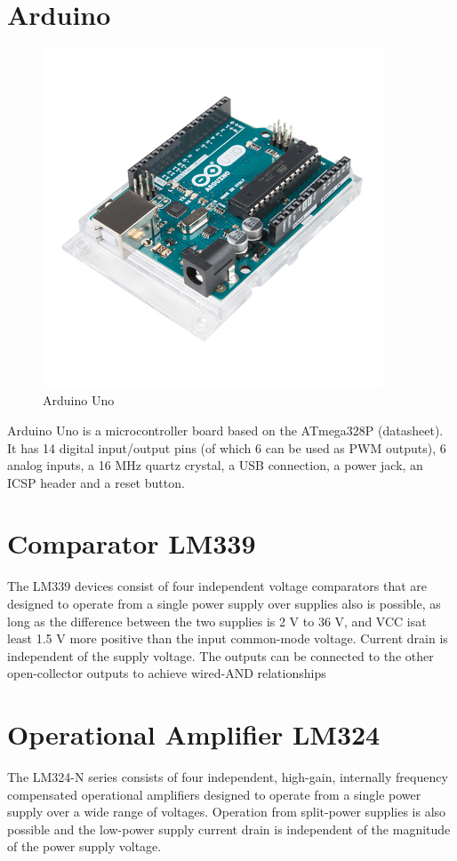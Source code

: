 \section{Arduino}{
\begin{figure}[H]
	\includegraphics[width=0.9\textwidth]{images/arduino.jpg} %
	\caption{Arduino Uno}
	\label{Arduino Uno}
\end{figure}
Arduino Uno is a microcontroller board based on the ATmega328P (datasheet). It has 14 digital input/output pins (of which 6 can be used as PWM outputs), 6 analog inputs, a 16 MHz quartz crystal, a USB connection, a power jack, an ICSP header and a reset button. 
}

\section{Comparator LM339}
{The LM339 devices consist of four independent voltage comparators that are designed to operate from a single power supply over supplies also is possible, as long as the difference between the two supplies is 2 V to 36 V, and VCC isat least 1.5 V more positive than the input common-mode voltage. Current drain is independent of the supply voltage. The outputs can be connected to the other open-collector outputs to achieve wired-AND relationships} 


\section{Operational Amplifier LM324}
{The LM324-N series consists of four independent,
high-gain, internally frequency compensated
operational amplifiers designed to operate from a
single power supply over a wide range of voltages.
Operation from split-power supplies is also possible
and the low-power supply current drain is
independent of the magnitude of the power supply
voltage.}

